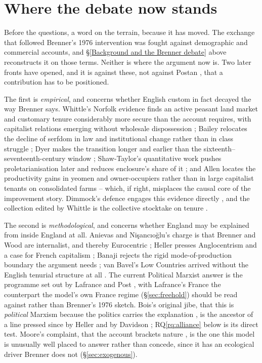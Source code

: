 \documentclass[11pt,english]{article}
\begin{document}
\section{Where the debate now stands}
\label{sec:debate}

Before the questions, a word on the terrain, because it has moved. The exchange that followed Brenner's 1976 intervention \cite{aston1985brenner} was fought against demographic and commercial accounts, and \S\ref{Background and the Brenner debate} above reconstructs it on those terms. Neither is where the argument now is. Two later fronts have opened, and it is against these, not against Postan \cite{postan1978population}, that a contribution has to be positioned.

The first is \emph{empirical}, and concerns whether English custom in fact decayed the way Brenner says. Whittle's Norfolk evidence finds an active peasant land market and customary tenure considerably more secure than the account requires, with capitalist relations emerging without wholesale dispossession \cite{whittle2000development}; Bailey relocates the decline of serfdom in law and institutional change rather than in class struggle \cite{bailey2014decline}; Dyer makes the transition longer and earlier than the sixteenth--seventeenth-century window \cite{dyer2005age}; Shaw-Taylor's quantitative work pushes proletarianisation later and reduces enclosure's share of it \cite{shawtaylor2012rise}; and Allen locates the productivity gains in yeomen and owner-occupiers rather than in large capitalist tenants on consolidated farms \cite{allen1992enclosure} -- which, if right, misplaces the causal core of the improvement story. Dimmock's defence engages this evidence directly \cite{dimmock2014origin}, and the collection edited by Whittle is the collective stocktake on tenure \cite{whittle2013landlords}.

The second is \emph{methodological}, and concerns whether England may be explained from inside England at all. Anievas and Ni\c{s}anc{\i}o\u{g}lu's charge is that Brenner and Wood are internalist, and thereby Eurocentric \cite{anievas2015west}; Heller presses Anglocentrism and a case for French capitalism \cite{heller2011birth}; Banaji rejects the rigid mode-of-production boundary the argument needs \cite{banaji2010theory}; van Bavel's Low Countries arrived without the English tenurial structure at all \cite{vanbavel2010manors}. The current Political Marxist answer is the programme set out by Lafrance and Post \cite{lafrance2019case}, with Lafrance's France \cite{lafrance2019making} the counterpart the model's own France regime (\S\ref{sec:freehold}) should be read against rather than Brenner's 1976 sketch. Bois's original jibe, that this is \emph{political} Marxism because the politics carries the explanation \cite{bois1978against}, is the ancestor of a line pressed since by Heller and by Davidson \cite{davidson2012revolutionary}; RQ\ref{rq:alliance} below is its direct test. Moore's complaint, that the account brackets nature \cite{moore2003nature,moore2015capitalism}, is the one this model is unusually well placed to answer rather than concede, since it has an ecological driver Brenner does not (\S\ref{sec:exogenous}).
\end{document}
